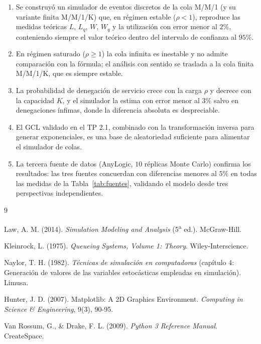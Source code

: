 \documentclass[11pt]{article}
\begin{document}
\begin{enumerate}
  \item Se construy\'o un simulador de eventos discretos de la cola M/M/1 (y
    su variante finita M/M/1/K) que, en r\'egimen estable ($\rho < 1$),
    reproduce las medidas te\'oricas $L$, $L_q$, $W$, $W_q$ y la
    utilizaci\'on con error menor al $2\%$, conteniendo siempre el valor
    te\'orico dentro del intervalo de confianza al $95\%$.
  \item En r\'egimen saturado ($\rho \ge 1$) la cola infinita es inestable y
    no admite comparaci\'on con la f\'ormula; el an\'alisis con sentido se
    traslada a la cola finita M/M/1/K, que es siempre estable.
  \item La probabilidad de denegaci\'on de servicio crece con la carga
    $\rho$ y decrece con la capacidad $K$, y el simulador la estima con error
    menor al $3\%$ salvo en denegaciones \'infimas, donde la diferencia
    absoluta es despreciable.
  \item El GCL validado en el TP 2.1, combinado con la transformaci\'on
    inversa para generar exponenciales, es una base de aleatoriedad
    suficiente para alimentar el simulador de colas.
  \item La tercera fuente de datos (AnyLogic, $10$ r\'eplicas Monte Carlo)
    confirma los resultados: las tres fuentes concuerdan con diferencias
    menores al $5\%$ en todas las medidas de la Tabla~\ref{tab:fuentes},
    validando el modelo desde tres perspectivas independientes.
\end{enumerate}

\begin{thebibliography}{9}

Law, A. M. (2014). \emph{Simulation Modeling and Analysis}
(5\textsuperscript{a} ed.). McGraw-Hill.

Kleinrock, L. (1975). \emph{Queueing Systems, Volume 1: Theory}.
Wiley-Interscience.

Naylor, T. H. (1982). \emph{T\'ecnicas de simulaci\'on en computadoras}
(cap\'itulo 4: Generaci\'on de valores de las variables estoc\'asticas
empleadas en simulaci\'on). Limusa.

Hunter, J. D. (2007). Matplotlib: A 2D Graphics Environment.
\emph{Computing in Science \& Engineering}, 9(3), 90-95.

Van Rossum, G., \& Drake, F. L. (2009). \emph{Python 3 Reference Manual}.
CreateSpace.

\end{thebibliography}
\end{document}
